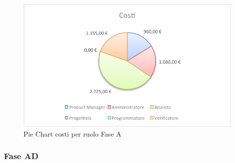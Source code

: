 				\begin{figure}[H]\centering
					\includegraphics[width=\textwidth]{PianoDiProgetto/Pics/ChartTotCostiFaseA.pdf}
					\caption{Pie Chart costi per ruolo Fase A}
				\end{figure}
		\subsubsection{Fase AD}
